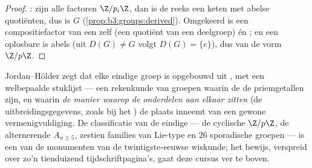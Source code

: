 \begin{proof}
: zijn alle factoren $\Z/p_i\Z$, dan is de reeks een
keten met abelse quotiënten, dus is $G$ 
(\cref{prop:b3:groups:derived}). Omgekeerd is een compositiefactor
van een  zelf  (een quotiënt van een
deelgroep) én ; en een oplosbare  is
abels (uit $D(G) \ne G$ volgt $D(G) = \{e\}$), dus van de vorm
$\Z/p\Z$.
\end{proof}

\begin{remark}\label{rem:b3:groups:jhmeaning}
Jordan--Hölder zegt dat elke eindige groep is opgebouwd uit
, met een welbepaalde stuklijst --- een
rekenkunde van groepen waarin de  de
priemgetallen zijn, en waarin \emph{de manier waarop de onderdelen
aan elkaar zitten} (de uitbreidingsgegevens, zoals bij het
) de plaats inneemt van een gewone
vermenigvuldiging. De classificatie van de eindige  --- de cyclische $\Z/p\Z$, de alternerende $A_{n \geq 5}$,
zestien families van Lie-type en $26$ sporadische groepen --- is
een van de monumenten van de twintigste-eeuwse wiskunde; het
bewijs, verspreid over zo'n tienduizend tijdschriftpagina's, gaat
deze cursus ver te boven.
\end{remark}

